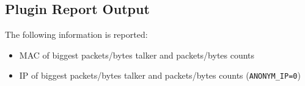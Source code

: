 \documentclass[documentation]{subfiles}
\begin{document}
\subsection{Plugin Report Output}
The following information is reported:
\begin{itemize}
    \item MAC of biggest packets/bytes talker and packets/bytes counts
    \item IP of biggest packets/bytes talker and packets/bytes counts ({\tt ANONYM\_IP=0})
\end{itemize}
\end{document}
